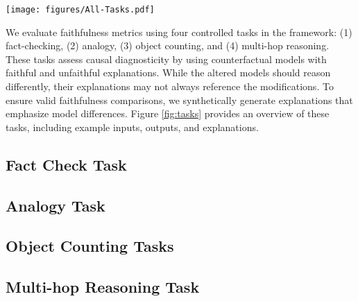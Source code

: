 \begin{figure*}[t]
    \centering
    \texttt{[image: figures/All-Tasks.pdf]}
    \caption{Overview of the four tasks: Fact Check, Analogy, Object Counting, and Multi-hop Reasoning, illustrated with example questions, answers, and explanations from the edited models. The explanations can either be generated by the model or synthetically constructed to align with specific edits, enabling the evaluation of diagnosticity. The blue and orange robots represent models $\BModel$ and $\OModel$, respectively, while the color-matched boxes below each model indicate the counterfactual knowledge injected through editing. Speech bubbles next to each model display their outputs, consisting of the answer ($\vy$) and explanation ($\bepsilon{}$ or $\oepsilon{}$). Although both models in each pair generate the same answers, their reasoning differs, as reflected in the explanations.
    }
    
    \label{fig:tasks}
\end{figure*}
We evaluate faithfulness metrics using four controlled tasks in the \methodname framework: (1) fact-checking, (2) analogy, (3)  object counting, and (4) multi-hop reasoning. These tasks assess causal diagnosticity by using counterfactual models with faithful and unfaithful explanations. While the altered models should reason differently, their explanations may not always reference the modifications. To ensure valid faithfulness comparisons, we synthetically generate explanations that emphasize model differences. Figure \ref{fig:tasks} provides an overview of these tasks, including example inputs, outputs, and explanations.


\subsection{Fact Check Task}


\subsection{Analogy Task}


\subsection{Object Counting Tasks}


\subsection{Multi-hop Reasoning Task}
